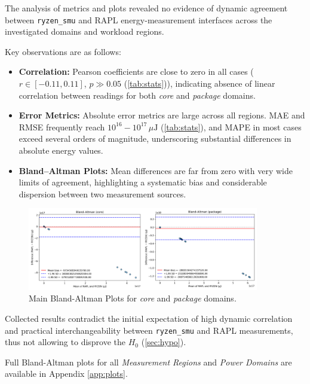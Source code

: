 The analysis of metrics and plots revealed no evidence of dynamic agreement
between \texttt{ryzen\_smu} and \gls{RAPL} energy-measurement interfaces
across the investigated domains and workload regions.

Key observations are as follows:

\begin{itemize}
  \item \textbf{Correlation:} Pearson coefficients are close to
  zero in all cases (\(r \in [-0.11,0.11]\), \(p \gg 0.05\) (\cref{tab:stats})),
  indicating absence of linear correlation between readings for both \emph{core}
  and \emph{package} domains.

  \item \textbf{Error Metrics:} Absolute error metrics are large across
  all regions. \gls{MAE} and \gls{RMSE} frequently reach \(10^{16}\!-
  \!10^{17}\,\mu\mathrm{J}\) (\cref{tab:stats}), and \gls{MAPE} in most cases
  exceed several orders of magnitude, underscoring substantial differences in
  absolute energy values.

  \item \textbf{Bland–Altman Plots:} Mean differences are
  far from zero with very wide limits of agreement, highlighting a systematic
  bias and considerable dispersion between two measurement sources.
\end{itemize}

\begin{figure}[htbp]
    \centering
    \includegraphics[width=0.9\textwidth]{assets/bland_altman}
    \caption{Main Bland-Altman Plots for \emph{core} and \emph{package} domains.}
    \label{fig:plots}
\end{figure}

Collected results contradict the initial expectation of high dynamic
correlation and practical interchangeability between \texttt{ryzen\_smu} and
\gls{RAPL} measurements, thus not allowing to disprove the $H_{0}$
(\cref{sec:hypo}).

Full Bland-Altman plots for all \emph{Measurement Regions} and \emph{Power Domains}
are available in Appendix \cref{app:plots}.

